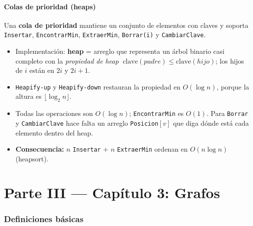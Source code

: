 \documentclass[11pt,a4paper]{article}
\theoremstyle{plain}
\theoremstyle{definition}
\theoremstyle{remark}
\begin{document}
\subsection{Colas de prioridad (heaps)}

Una \textbf{cola de prioridad} mantiene un conjunto de elementos con claves y soporta
\texttt{Insertar}, \texttt{EncontrarMin}, \texttt{ExtraerMin}, \texttt{Borrar(i)} y
\texttt{CambiarClave}.

\begin{itemize}
\item Implementación: \textbf{heap} = arreglo que representa un árbol binario casi
completo con la \emph{propiedad de heap} $\;\text{clave}(padre)\le\text{clave}(hijo)$;
los hijos de $i$ están en $2i$ y $2i+1$.
\item \texttt{Heapify-up} y \texttt{Heapify-down} restauran la propiedad en
$O(\log n)$, porque la altura es $\lfloor\log_2 n\rfloor$.
\item Todas las operaciones son $O(\log n)$; \texttt{EncontrarMin} es $O(1)$. Para
\texttt{Borrar} y \texttt{CambiarClave} hace falta un arreglo \texttt{Posicion}$[v]$
que diga dónde está cada elemento dentro del heap.
\item \textbf{Consecuencia:} $n$ \texttt{Insertar} $+$ $n$ \texttt{ExtraerMin}
ordenan en $O(n\log n)$ (heapsort).
\end{itemize}

\part*{Parte III --- Capítulo 3: Grafos}

\section{Definiciones básicas}
\end{document}
